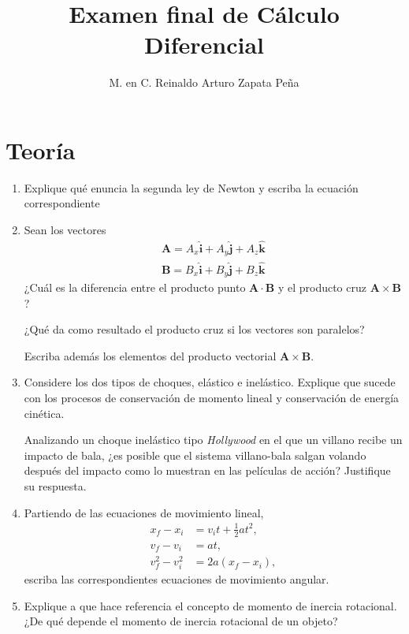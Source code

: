 \documentclass{article}
\title{Examen final de Cálculo Diferencial}
\author{M. en C. Reinaldo Arturo Zapata Peña}
\begin{document}


\section{Teoría} %
\label{sec:teoria}

\begin{enumerate}

\item Explique qu\'e enuncia la segunda ley de Newton y escriba la ecuaci\'on
correspondiente

\item Sean los vectores 
\begin{align}
\mathbf{A} = A_{x}\mathbf{\hat{i}} +
A_{y}\mathbf{\hat{j}} + A_{z}\mathbf{\hat{k}} \\
\mathbf{B} = B_{x}\mathbf{\hat{i}} + B_{y}\mathbf{\hat{j}} +
B_{z}\mathbf{\hat{k}}
\end{align}
¿Cuál es la diferencia entre el producto punto $\mathbf{A} \cdot \mathbf{B}$ y
el producto cruz $\mathbf{A} \times \mathbf{B}$? 

¿Qué da como resultado el producto cruz si los vectores son paralelos? 

Escriba además los elementos del producto vectorial $\mathbf{A}\times
\mathbf{B}$.

\item Considere los dos tipos de choques, elástico e inelástico. Explique que
sucede con los procesos de conservación de momento lineal y conservación de
energía cinética. 

Analizando un choque inelástico tipo \emph{Hollywood} en el que un villano
recibe un impacto de bala, ¿es posible que el sistema villano-bala salgan
volando después del impacto como lo muestran en las películas de acción?
Justifique su respuesta.

\item Partiendo de las ecuaciones de movimiento lineal, 
\begin{align}
x_{f} - x_{i} &= v_{i}t + \frac{1}{2}at^{2}, \\
v_{f} - v_{i} &= at, \\
v_{f}^{2} - v_{i}^{2} &= 2a(x_{f} - x_{i}),
\end{align}
escriba las correspondientes ecuaciones de movimiento angular.

\item Explique a que hace referencia el concepto de momento de inercia
rotacional. ¿De qué depende el momento de inercia rotacional de un objeto?


\end{enumerate}
\end{document}
